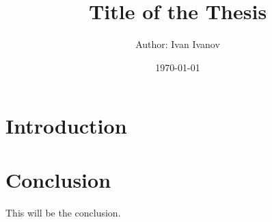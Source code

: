\documentclass[a4paper,12pt]{report}
\begin{document}
\title{Title of the Thesis}
\author{Author: Ivan Ivanov}
\date{\today}

\maketitle
\tableofcontents  %

\chapter{Introduction}

\chapter{Conclusion}
This will be the conclusion.
\end{document}
